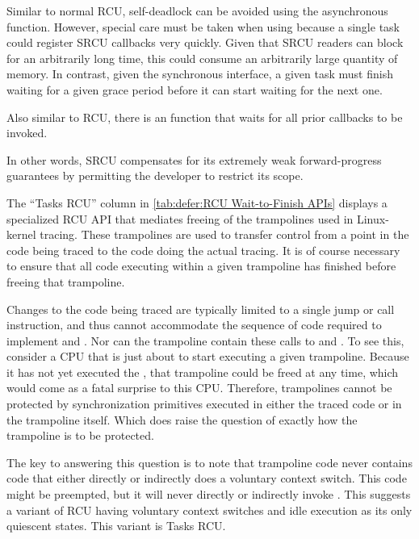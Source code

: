 Similar to normal RCU, self-deadlock can be avoided using the
asynchronous  function.
However, special care must be taken when using  because
a single task could register SRCU callbacks very quickly.
Given that SRCU readers can block for an arbitrarily long
time, this could consume an arbitrarily large quantity of memory.
In contrast, given the synchronous 
interface, a given task must finish waiting for a given grace period
before it can start waiting for the next one.

Also similar to RCU, there is an  function that waits
for all prior  callbacks to be invoked.

In other words, SRCU compensates for its extremely weak
forward-progress guarantees by permitting the developer to restrict
its scope.

The ``Tasks RCU'' column in
\cref{tab:defer:RCU Wait-to-Finish APIs} displays a specialized
RCU API that mediates freeing of the trampolines used in Linux-kernel
tracing.
These trampolines are used to transfer control from a point in the
code being traced to the code doing the actual tracing.
It is of course necessary to ensure that all code executing within
a given trampoline has finished before freeing that trampoline.

Changes to the code being traced are typically limited to a single jump
or call instruction, and thus cannot accommodate the sequence of code
required to implement  and .
Nor can the trampoline contain these calls to  and
.
To see this, consider a CPU that is just about to start executing a
given trampoline.
Because it has not yet executed the , that
trampoline could be freed at any time, which would come as a fatal
surprise to this CPU\@.
Therefore, trampolines cannot be protected by synchronization primitives
executed in either the traced code or in the trampoline itself.
Which does raise the question of exactly how the trampoline is to be
protected.

The key to answering this question is to note that trampoline code
never contains code that either directly or indirectly does a
voluntary context switch.
This code might be preempted, but it will never directly or indirectly
invoke .
This suggests a variant of RCU having voluntary context switches and
idle execution as its only quiescent states.
This variant is Tasks RCU\@.

